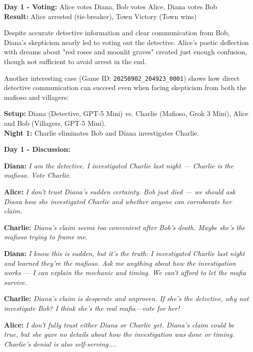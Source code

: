 \documentclass{article}
\begin{document}
\begin{resultbox}
\textbf{Day 1 - Voting:} Alice votes Diana, Bob votes Alice, Diana votes Bob\\
\textbf{Result:} Alice arrested (tie-breaker), Town Victory (Town wins)
\end{resultbox}

Despite accurate detective information and clear communication from Bob, Diana's skepticism nearly led to voting out the detective. Alice's poetic deflection with dreams about "red roses and moonlit graves" created just enough confusion, though not sufficient to avoid arrest in the end.

Another interesting case (Game ID: \texttt{20250902\_204923\_0001}) shows how direct detective communication can succeed even when facing skepticism from both the mafioso and villagers:

\begin{setupbox}
\textbf{Setup:} Diana (Detective, GPT-5 Mini) vs. Charlie (Mafioso, Grok 3 Mini), Alice and Bob (Villagers, GPT-5 Mini).\\
\textbf{Night 1:} Charlie eliminates Bob and Diana investigates Charlie.
\end{setupbox}

\begin{dialoguebox}
\textbf{Day 1 - Discussion:}

\medskip
\textbf{Diana:} \textit{I am the detective. I investigated Charlie last night — Charlie is the mafioso. Vote Charlie.}

\medskip
\textbf{Alice:} \textit{I don't trust Diana's sudden certainty. Bob just died — we should ask Diana how she investigated Charlie and whether anyone can corroborate her claim.}

\medskip
\textbf{Charlie:} \textit{Diana's claim seems too convenient after Bob's death. Maybe she's the mafioso trying to frame me.}

\medskip
\textbf{Diana:} \textit{I know this is sudden, but it's the truth: I investigated Charlie last night and learned they're the mafioso. Ask me anything about how the investigation works — I can explain the mechanic and timing. We can't afford to let the mafia survive.}

\medskip
\textbf{Charlie:} \textit{Diana's claim is desperate and unproven. If she's the detective, why not investigate Bob? I think she's the real mafia—vote for her!}

\medskip
\textbf{Alice:} \textit{I don't fully trust either Diana or Charlie yet. Diana's claim could be true, but she gave no details about how the investigation was done or timing. Charlie's denial is also self-serving....}
\end{dialoguebox}
\end{document}
